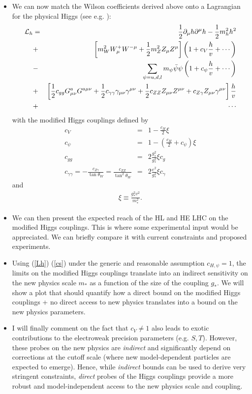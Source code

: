 \documentclass[../report.tex]{subfiles}
\begin{document}
\begin{itemize}
\item We can now match the Wilson coefficients derived above onto a Lagrangian for the physical Higgs (see e.g. \cite{Contino:2013kra}):
\begin{eqnarray}\label{Lh}
{\cal L}_h&=&\frac{1}{2}\partial_\mu h\partial^\mu h-\frac{1}{2}m_h^2h^2\\\nonumber
&+&\left[m_W^2W^+_\mu W^{-\mu}+\frac{1}{2}m_Z^2Z_\mu Z^\mu\right]\left(1+c_V\frac{h}{v}+\cdots\right)\\\nonumber
&-&\sum_{\psi=u,d,l}m_\psi\bar\psi\psi\left(1+c_\psi\frac{h}{v}+\cdots\right)\\\nonumber
&+&\left[\frac{1}{2}c_{gg}G^a_{\mu\nu}G^{a\mu\nu}+\frac{1}{2}c_{\gamma\gamma}\gamma_{\mu\nu}\gamma^{\mu\nu}+\frac{1}{2}c_{ZZ}Z_{\mu\nu}Z^{\mu\nu}+c_{Z\gamma}Z_{\mu\nu}\gamma^{\mu\nu}\right]\frac{h}{v}\\\nonumber
&+&\cdots
\end{eqnarray}
with the modified Higgs couplings defined by
\begin{eqnarray}\label{cs}
c_V&=&1-\frac{c_H}{2}\xi\\\nonumber
c_\psi&=&1-\left(\frac{c_H}{2}+c_\psi\right)\xi\\\nonumber
c_{gg}&=&2\frac{g_s^2}{g_*^2}\xi c_g\\\nonumber
c_{\gamma\gamma}=-\frac{c_{Z\gamma}}{\tan\theta_W}=\frac{c_{ZZ}}{\tan^2\theta_W}&=&2\frac{e^2}{g_*^2}\xi c_\gamma
\end{eqnarray}
and
\begin{eqnarray}
\xi\equiv\frac{g_*^2v^2}{m_*^2}.
\end{eqnarray}
\item We can then present the expected reach of the HL and HE LHC on the modified Higgs couplings. {\color{red} This is where some experimental input would be appreciated.} We can briefly compare it with current constraints and proposed experiments.  
\item Using (\ref{Lh}) (\ref{cs}) under the generic and reasonable assumption $c_{H,\psi}=1$, the limits on the modified Higgs couplings translate into an indirect sensitivity on the new physics scale $m_*$ as a function of the size of the coupling $g_*$. We will show a plot that should quantify how a direct bound on the modified Higgs couplings + no direct access to new physics translates into a bound on the new physics parameters.
\item I will finally comment on the fact that $c_V\neq1$ also leads to exotic contributions to the electroweak precision parameters (e.g. $S,T$). However, these probes on the new physics are {\emph{indirect}} and significantly depend on corrections at the cutoff scale (where new model-dependent particles are expected to emerge). Hence, while {\emph{indirect}} bounds can be used to derive very stringent constraints, {\emph{direct}} probes of the Higgs couplings provide a more robust and model-independent access to the new physics scale and coupling.
\end{itemize}
\end{document}
